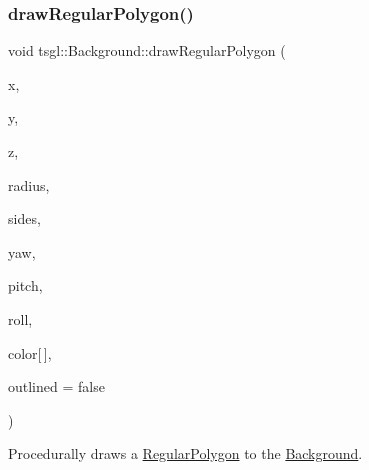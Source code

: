 \subsubsection{\texorpdfstring{draw\+Regular\+Polygon()}{drawRegularPolygon()}\hspace{0.1cm}{\footnotesize\ttfamily [2/2]}}
{\footnotesize\ttfamily void tsgl\+::\+Background\+::draw\+Regular\+Polygon (\begin{DoxyParamCaption}\item[{float}]{x,  }\item[{float}]{y,  }\item[{float}]{z,  }\item[{float}]{radius,  }\item[{int}]{sides,  }\item[{float}]{yaw,  }\item[{float}]{pitch,  }\item[{float}]{roll,  }\item[{\hyperlink{structtsgl_1_1_color_float}{Color\+Float}}]{color\mbox{[}$\,$\mbox{]},  }\item[{bool}]{outlined = {\ttfamily false} }\end{DoxyParamCaption})\hspace{0.3cm}{\ttfamily [virtual]}}



Procedurally draws a \hyperlink{classtsgl_1_1_regular_polygon}{Regular\+Polygon} to the \hyperlink{classtsgl_1_1_background}{Background}. 

